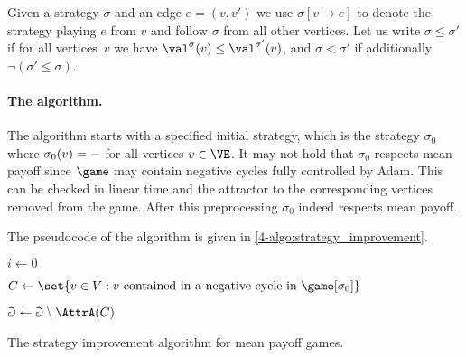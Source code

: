 Given a strategy $\sigma$ and an edge $e = (v,v')$ we use $\sigma[v \to e]$ to denote the strategy playing $e$ from $v$ 
and follow $\sigma$ from all other vertices.
Let us write $\sigma \le \sigma'$ if for all vertices~$v$ we have $\val^{\sigma}(v) \le \val^{\sigma'}(v)$,
and $\sigma < \sigma'$ if additionally $\neg (\sigma' \le \sigma)$.

\paragraph{\bf The algorithm.}
The algorithm starts with a specified initial strategy, which is the strategy
$\sigma_0$ where $\sigma_0(v) = \mathtt{-}$ for all vertices $v \in \VE$. 
It may not hold that $\sigma_0$ respects mean payoff since $\game$ may contain negative cycles fully controlled by Adam.
This can be checked in linear time and the attractor to the corresponding vertices removed from the game.
After this preprocessing $\sigma_0$ indeed respects mean payoff.

The pseudocode of the algorithm is given in \cref{4-algo:strategy_improvement}.

\begin{algorithm}
 \DontPrintSemicolon
 
 $i \leftarrow 0$
 

 $C \leftarrow \set{v \in V : v \text{ contained in a negative cycle in } \game[\sigma_0]}$

 $\Game \leftarrow \Game \setminus \AttrA(C)$
 

 \caption{The strategy improvement algorithm for mean payoff games.}
\label{4-algo:strategy_improvement}
\end{algorithm}


